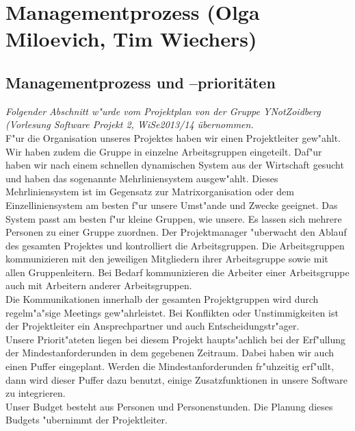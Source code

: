 \documentclass[fontsize=12pt,paper=a4,twoside]{scrartcl}
\begin{document}

\newpage
\section{Managementprozess (Olga Miloevich, Tim Wiechers)}

\subsection{Managementprozess und --prioritäten}

\textit{Folgender Abschnitt w"urde vom Projektplan von der Gruppe YNotZoidberg (Vorlesung Software Projekt 2, WiSe2013/14 übernommen.}\\

F"ur die Organisation unseres Projektes haben wir einen Projektleiter gew"ahlt.\\
Wir haben zudem die Gruppe in einzelne Arbeitsgruppen eingeteilt. Daf"ur haben wir nach einem schnellen dynamischen System aus der Wirtschaft gesucht und haben das sogenannte Mehrliniensystem ausgew"ahlt. Dieses Mehrliniensystem ist im Gegensatz zur Matrixorganisation oder dem Einzelliniensystem am besten f"ur unsere Umst"ande und Zwecke geeignet. Das System passt am besten f"ur kleine Gruppen, wie unsere. Es lassen sich mehrere Personen zu einer Gruppe zuordnen. \newline
Der Projektmanager "uberwacht den Ablauf des gesamten Projektes und kontrolliert die Arbeitsgruppen. Die Arbeitsgruppen kommunizieren mit den jeweiligen Mitgliedern ihrer Arbeitsgruppe sowie mit allen Gruppenleitern. Bei Bedarf kommunizieren die Arbeiter einer Arbeitsgruppe auch mit Arbeitern anderer Arbeitsgruppen. \\
Die Kommunikationen innerhalb der gesamten Projektgruppen wird durch regelm"a"sige Meetings gew"ahrleistet. Bei Konflikten oder Unstimmigkeiten ist der Projektleiter ein Ansprechpartner und auch Entscheidungstr"ager.\\
Unsere Priorit"ateten liegen bei diesem Projekt haupts"achlich bei der Erf"ullung der Mindestanforderunden in dem gegebenen Zeitraum. Dabei haben wir auch einen Puffer eingeplant. Werden die Mindestanforderunden fr"uhzeitig erf"ullt, dann wird dieser Puffer dazu benutzt, einige Zusatzfunktionen in unsere Software zu integrieren. \\
Unser Budget besteht aus Personen und Personenstunden. Die Planung dieses Budgets "ubernimmt der Projektleiter.\\
\end{document}

